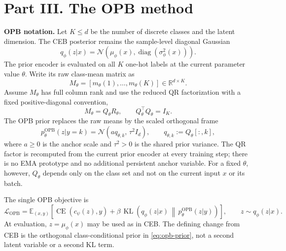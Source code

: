 \section*{Part III. The OPB method}

\textbf{OPB notation.}
Let $K \le d$ be the number of discrete classes and the latent dimension. The
CEB posterior remains the sample-level diagonal Gaussian
\begin{equation}
q_\phi(z|x) = \mathcal{N}\!\left(\mu_\phi(x),
\operatorname{diag}(\sigma^2_\phi(x))\right).
\label{eq:opb-posterior}
\end{equation}
The prior encoder is evaluated on all $K$ one-hot labels at the current parameter
value $\theta$. Write its raw class-mean matrix as
\begin{equation}
M_\theta = [m_\theta(1),\ldots,m_\theta(K)] \in \mathbb{R}^{d\times K}.
\label{eq:opb-raw-matrix}
\end{equation}
Assume $M_\theta$ has full column rank and use the reduced QR factorization with a
fixed positive-diagonal convention,
\begin{equation}
M_\theta = Q_\theta R_\theta,
\qquad Q_\theta^{\top}Q_\theta = I_K.
\label{eq:opb-qr}
\end{equation}
The OPB prior replaces the raw means by the scaled orthogonal frame
\begin{equation}
p_{\theta}^{\mathrm{OPB}}(z|y=k)
= \mathcal{N}\!\left(a q_{\theta,k},\,\tau^2 I_d\right),
\qquad q_{\theta,k}:=Q_\theta[:,k],
\label{eq:opb-prior}
\end{equation}
where $a \ge 0$ is the anchor scale and $\tau^2>0$ is the shared prior variance.
The QR factor is recomputed from the current prior encoder at every training step;
there is no EMA prototype and no additional persistent anchor variable. For a fixed
$\theta$, however, $Q_\theta$ depends only on the class set and not on the current
input $x$ or its batch.

The single OPB objective is
\begin{equation}
\mathcal{L}_{\mathrm{OPB}}
= \mathbb{E}_{(x,y)}\left[
\operatorname{CE}(c_\psi(z),y)
+ \beta\,\operatorname{KL}\!\left(q_\phi(z|x)\,
\middle\|\,p_{\theta}^{\mathrm{OPB}}(z|y)\right)
\right],
\qquad z\sim q_\phi(z|x).
\label{eq:opb-objective}
\end{equation}
At evaluation, $z=\mu_\phi(x)$ may be used as in CEB. The defining change from CEB
is the orthogonal class-conditional prior in \eqref{eq:opb-prior}, not a second
latent variable or a second KL term.

